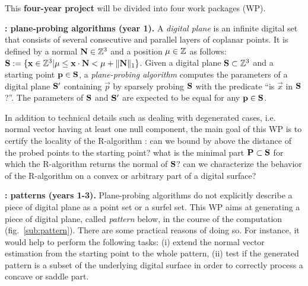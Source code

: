 This \textbf{four-year project} will be divided into four work packages (WP).

\noindent\textbf{\wpPPA: plane-probing algorithms (year 1).} 
A \emph{digital plane} is an infinite digital set that 
consists of several consecutive and parallel layers of coplanar points. 
It is defined by a normal $\mathbf{N} \in {\ensuremath\mathbb{Z}}^3$ and a position $\mu \in {\ensuremath\mathbb{Z}}$ as follows:  
$\mathbf{S} := \{ \mathbf{x} \in {\ensuremath\mathbb{Z}}^3 | \mu \leq \mathbf{x} \cdot \mathbf{N} < \mu + \|\mathbf{N}\|_1 \}$.
Given a digital plane $\mathbf{S} \subset {\ensuremath\mathbb{Z}}^3$ and a starting point $\mathbf{p} \in \mathbf{S}$, 
a \emph{plane-probing algorithm} computes the parameters of a digital plane $\mathbf{S}'$
containing $\vec{p}$ by sparsely probing $\mathbf{S}$ with the predicate ``is $\vec{x}$ in $\mathbf{S}$?''. 
The parameters of $\mathbf{S}$ and $\mathbf{S}'$ are expected to be equal for any $\mathbf{p} \in \mathbf{S}$. 

In addition to technical details such as dealing with degenerated cases, 
i.e. normal vector having at least one null component, the main goal of this WP is to 
certify the locality of the R-algorithm \cite{LPRJMIV2017}: 
can we bound by above the distance of the probed points to the starting point? 
what is the minimal part $\mathbf{P} \subset \mathbf{S}$ for which the R-algorithm returns the normal of $\mathbf{S}$?
can we characterize the behavior of the R-algorithm on a convex or arbitrary part of a digital surface?


\noindent\textbf{\wpPattern: patterns (years 1-3).}
Plane-probing algorithms 
do not explicitly describe a piece of digital plane as a point set or a surfel set.  
This WP aims at generating a piece of digital plane, called \emph{pattern} below, in the course of the computation (fig.~\ref{sub:pattern}).
There are some practical reasons of doing so. For instance, it would help to perform the following tasks: 
(i) extend the normal vector estimation from the starting point to the whole pattern, 
(ii) test if the generated pattern is a subset of the underlying digital surface 
in order to correctly process a concave or saddle part.


